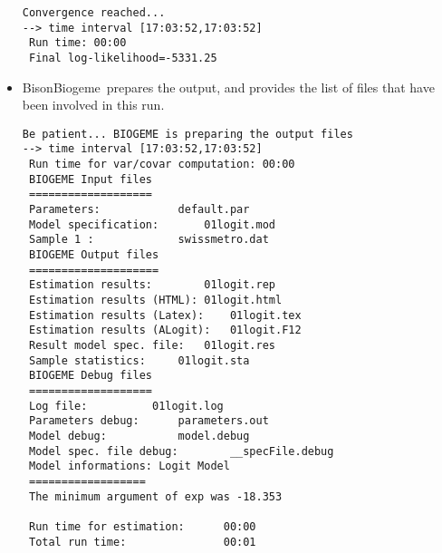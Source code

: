 \documentclass[12pt,a4paper]{article}
\newcommand{\BBIOGEME}{BisonBiogeme}
\begin{document}
\begin{itemize}
\begin{lstlisting}[basicstyle=\ttfamily\tiny]
 Convergence reached...
--> time interval [17:03:52,17:03:52]
 Run time: 00:00
 Final log-likelihood=-5331.25
\end{lstlisting}
\item \BBIOGEME\ prepares the output, and provides the list of files
  that have been involved in this run.
\begin{lstlisting}[basicstyle=\ttfamily\tiny]
 Be patient... BIOGEME is preparing the output files
--> time interval [17:03:52,17:03:52]
 Run time for var/covar computation: 00:00
 BIOGEME Input files
 ===================
 Parameters:			default.par
 Model specification:		01logit.mod
 Sample 1 :				swissmetro.dat
 BIOGEME Output files
 ====================
 Estimation results:		01logit.rep
 Estimation results (HTML):	01logit.html
 Estimation results (Latex):	01logit.tex
 Estimation results (ALogit):	01logit.F12
 Result model spec. file:	01logit.res
 Sample statistics:		01logit.sta
 BIOGEME Debug files
 ===================
 Log file:			01logit.log
 Parameters debug:		parameters.out
 Model debug:			model.debug
 Model spec. file debug:		__specFile.debug
 Model informations: Logit Model
 ==================
 The minimum argument of exp was -18.353

 Run time for estimation:      00:00
 Total run time:               00:01
\end{lstlisting}
\end{itemize}
\end{document}
